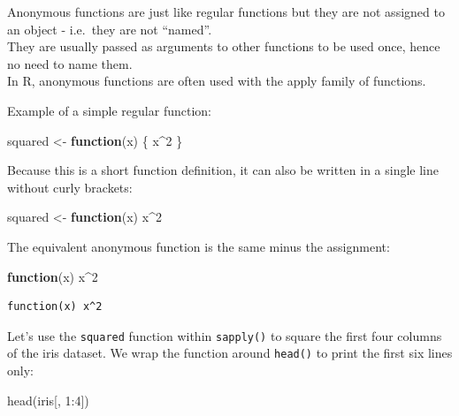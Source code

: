 \documentclass[
]{book}
\newenvironment{Shaded}{\begin{snugshade}}{\end{snugshade}}
\newcommand{\ControlFlowTok}[1]{\textcolor[rgb]{0.13,0.29,0.53}{\textbf{#1}}}
\newcommand{\DecValTok}[1]{\textcolor[rgb]{0.00,0.00,0.81}{#1}}
\newcommand{\FunctionTok}[1]{\textcolor[rgb]{0.00,0.00,0.00}{#1}}
\newcommand{\NormalTok}[1]{#1}
\newcommand{\OtherTok}[1]{\textcolor[rgb]{0.56,0.35,0.01}{#1}}
\newcommand{\SpecialCharTok}[1]{\textcolor[rgb]{0.00,0.00,0.00}{#1}}
\begin{document}
Anonymous functions are just like regular functions but they are not assigned to an object - i.e.~they are not ``named''.\\
They are usually passed as arguments to other functions to be used once, hence no need to name them.\\
In R, anonymous functions are often used with the apply family of functions.

Example of a simple regular function:

\begin{Shaded}
\begin{Highlighting}[]
\NormalTok{squared }\OtherTok{\textless{}{-}} \ControlFlowTok{function}\NormalTok{(x) \{}
\NormalTok{  x}\SpecialCharTok{\^{}}\DecValTok{2}
\NormalTok{\}}
\end{Highlighting}
\end{Shaded}

Because this is a short function definition, it can also be written in a single line without curly brackets:

\begin{Shaded}
\begin{Highlighting}[]
\NormalTok{squared }\OtherTok{\textless{}{-}} \ControlFlowTok{function}\NormalTok{(x) x}\SpecialCharTok{\^{}}\DecValTok{2}
\end{Highlighting}
\end{Shaded}

The equivalent anonymous function is the same minus the assignment:

\begin{Shaded}
\begin{Highlighting}[]
\ControlFlowTok{function}\NormalTok{(x) x}\SpecialCharTok{\^{}}\DecValTok{2}
\end{Highlighting}
\end{Shaded}

\begin{verbatim}
function(x) x^2
\end{verbatim}

Let's use the \texttt{squared} function within \texttt{sapply()} to square the first four columns of the iris dataset. We wrap the function around \texttt{head()} to print the first six lines only:

\begin{Shaded}
\begin{Highlighting}[]
\FunctionTok{head}\NormalTok{(iris[, }\DecValTok{1}\SpecialCharTok{:}\DecValTok{4}\NormalTok{])}
\end{Highlighting}
\end{Shaded}
\end{document}
